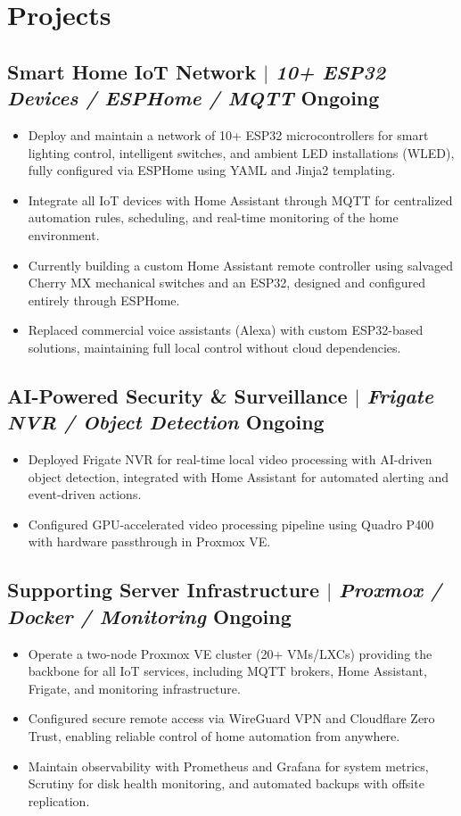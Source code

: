 \documentclass[10pt]{article}
\begin{document}
\section{Projects}
\subsection{Smart Home IoT Network $|$ \normalfont\textit{10+ ESP32 Devices / ESPHome / MQTT} \hfill Ongoing}
\begin{itemize}
	\item Deploy and maintain a network of 10+ ESP32 microcontrollers for smart lighting control, intelligent switches, and ambient LED installations (WLED), fully configured via ESPHome using YAML and Jinja2 templating.
	\item Integrate all IoT devices with Home Assistant through MQTT for centralized automation rules, scheduling, and real-time monitoring of the home environment.
	\item Currently building a custom Home Assistant remote controller using salvaged Cherry MX mechanical switches and an ESP32, designed and configured entirely through ESPHome.
	\item Replaced commercial voice assistants (Alexa) with custom ESP32-based solutions, maintaining full local control without cloud dependencies.
\end{itemize}

\subsection{AI-Powered Security \& Surveillance $|$ \normalfont\textit{Frigate NVR / Object Detection} \hfill Ongoing}
\begin{itemize}
	\item Deployed Frigate NVR for real-time local video processing with AI-driven object detection, integrated with Home Assistant for automated alerting and event-driven actions.
	\item Configured GPU-accelerated video processing pipeline using Quadro P400 with hardware passthrough in Proxmox VE.
\end{itemize}

\subsection{Supporting Server Infrastructure $|$ \normalfont\textit{Proxmox / Docker / Monitoring} \hfill Ongoing}
\begin{itemize}
	\item Operate a two-node Proxmox VE cluster (20+ VMs/LXCs) providing the backbone for all IoT services, including MQTT brokers, Home Assistant, Frigate, and monitoring infrastructure.
	\item Configured secure remote access via WireGuard VPN and Cloudflare Zero Trust, enabling reliable control of home automation from anywhere.
	\item Maintain observability with Prometheus and Grafana for system metrics, Scrutiny for disk health monitoring, and automated backups with offsite replication.
\end{itemize}
\end{document}
